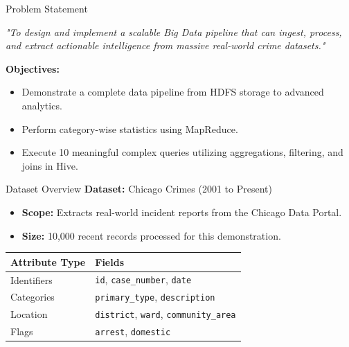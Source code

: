 \documentclass[aspectratio=169]{beamer}
\begin{document}
\begin{frame}{Problem Statement}
    \begin{center}
        \Large \textit{\textcolor{NavyBlue}{"To design and implement a scalable Big Data pipeline that can ingest, process, and extract actionable intelligence from massive real-world crime datasets."}}
    \end{center}
    \vspace{0.5cm}
    \textbf{Objectives:}
    \begin{itemize}
        \item Demonstrate a complete data pipeline from HDFS storage to advanced analytics.
        \item Perform category-wise statistics using MapReduce.
        \item Execute 10 meaningful complex queries utilizing aggregations, filtering, and joins in Hive.
    \end{itemize}
\end{frame}

\begin{frame}{Dataset Overview}
    \textbf{Dataset:} Chicago Crimes (2001 to Present)\\
    \vspace{0.2cm}
    \begin{itemize}
        \item \textbf{Scope:} Extracts real-world incident reports from the Chicago Data Portal.
        \item \textbf{Size:} 10,000 recent records processed for this demonstration.
    \end{itemize}
    \vspace{0.3cm}
    \begin{center}
        \begin{tabular}{@{}ll@{}}
            \toprule
            \textbf{\textcolor{NavyBlue}{Attribute Type}} & \textbf{\textcolor{NavyBlue}{Fields}} \\ \midrule
            Identifiers & \texttt{id}, \texttt{case\_number}, \texttt{date} \\
            Categories & \texttt{primary\_type}, \texttt{description} \\
            Location & \texttt{district}, \texttt{ward}, \texttt{community\_area} \\
            Flags & \texttt{arrest}, \texttt{domestic} \\ \bottomrule
        \end{tabular}
    \end{center}
\end{frame}
\end{document}
